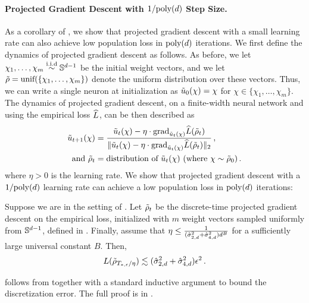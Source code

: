 \paragraph{Projected Gradient Descent with $1/\textup{poly}(d)$ Step Size.} 
As a corollary of , we show that projected gradient descent with a small learning rate can also achieve low population loss in $\textup{poly}(d)$ iterations. We first define the dynamics of projected gradient descent as follows. As before, we let $\chi_1, \ldots, \chi_m \overset{\textup{i.i.d}}{\sim} \mathbb{S}^{d - 1}$ be the initial weight vectors, and we let ${\tilde{\rho}} = \textup{unif}(\{\chi_1, \ldots, \chi_m\})$ denote the uniform distribution over these vectors. Thus, we can write a single neuron at initialization as $\tilde{u}_0(\chi) = \chi$ for $\chi \in \{\chi_1, \ldots, \chi_m\}$. The dynamics of projected gradient descent, on a finite-width neural network and using the empirical loss $\widehat{L}$, can be then described as
\begin{align}
\tilde{u}_{t + 1}(\chi) & = \frac{\tilde{u}_t(\chi) - \eta \cdot {\textup{grad}}_{\tilde{u}_t(\chi)} \widehat{L}({\tilde{\rho}}_t)}{\|\tilde{u}_t(\chi) - \eta \cdot {\textup{grad}}_{\tilde{u}_t(\chi)} \widehat{L}({\tilde{\rho}}_t)\|_2} \,, \\
\text{ and } {\tilde{\rho}}_t & = \textup{distribution of $\tilde{u}_t(\chi)$ (where $\chi \sim {\tilde{\rho}}_0$)}  \,.\label{eqn:GD_t}
\end{align}
where $\eta > 0$ is the learning rate.\footnotemark {} We show that projected gradient descent with a $1/\textup{poly}(d)$ learning rate can achieve a low population loss in $\textup{poly}(d)$ iterations:

\begin{theorem} 
\label{thm:projectedGD_main}
Suppose we are in the setting of . Let ${\tilde{\rho}}_t$ be the discrete-time projected gradient descent on the empirical loss, initialized with $m$ weight vectors sampled uniformly from $\mathbb{S}^{d - 1}$, defined in . Finally, assume that $\eta \leq \frac{1}{(\hat{\sigma}_{2, d}^2 + \hat{\sigma}_{4, d}^2) d^B}$ for a sufficiently large universal constant $B$. Then,
\begin{align}
L({\tilde{\rho}}_{T_{*, \epsilon}/\eta}) \lesssim (\hat{\sigma}_{2, d}^2 + \hat{\sigma}_{4, d}^2) \epsilon^2 \,.
\end{align}
\end{theorem}

 follows from  together with a standard inductive argument to bound the discretization error. The full proof is in .

